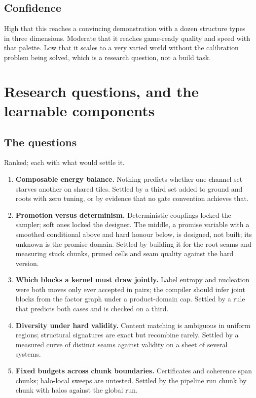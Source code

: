 \documentclass[11pt]{article}
\newcommand{\1}{\mathds{1}}
\begin{document}
\subsection{Confidence}

High that this reaches a convincing demonstration with a dozen structure
types in three dimensions. Moderate that it reaches game-ready quality and
speed with that palette. Low that it scales to a very varied world without
the calibration problem being solved, which is a research question, not a
build task.

\section{Research questions, and the learnable components}
\label{sec:research}

\subsection{The questions}

Ranked; each with what would settle it.
\begin{enumerate}
\item \textbf{Composable energy balance.} Nothing predicts whether one
  channel set starves another on shared tiles. Settled by a third set
  added to ground and roots with zero tuning, or by evidence that no gate
  convention achieves that.
\item \textbf{Promotion versus determinism.} Deterministic couplings locked
  the sampler; soft ones locked the designer. The middle, a promise
  variable with a smoothed conditional above and hard honour below, is
  designed, not built; its unknown is the promise domain. Settled by
  building it for the root seams and measuring stuck chunks, pruned cells
  and seam quality against the hard version.
\item \textbf{Which blocks a kernel must draw jointly.} Label entropy and
  nucleation were both moves only ever accepted in pairs; the compiler
  should infer joint blocks from the factor graph under a product-domain
  cap. Settled by a rule that predicts both cases and is checked on a
  third.
\item \textbf{Diversity under hard validity.} Content matching is ambiguous
  in uniform regions; structural signatures are exact but recombine
  rarely. Settled by a measured curve of distinct seams against validity
  on a sheet of several systems.
\item \textbf{Fixed budgets across chunk boundaries.} Certificates and
  coherence span chunks; halo-local sweeps are untested. Settled by the
  pipeline run chunk by chunk with halos against the global run.
\end{enumerate}
\end{document}
